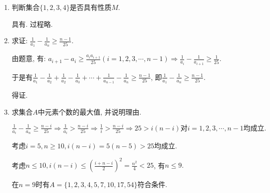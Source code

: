 \documentclass[8pt]{article}
\begin{document}
\begin{enumerate}[label=(\arabic*)]
			\begin{enumerate}[label=(\arabic*)]
				\item 判断集合$\{1,2,3,4\}$是否具有性质$M$.
					
					具有. 过程略.
				
				\item 求证: $\displaystyle \frac{1}{a_1}-\frac{1}{a_n}\geq\frac{n-1}{25}.$

					由题意, 有: $\displaystyle a_{i+1}-a_i \geq \frac{a_i a_{i+1}}{25} (i=1,2,3, \cdots, n-1) \Rightarrow \frac{1}{a_i}-\frac{1}{a_{i+1}}\geq \frac{1}{25}.$

					于是有$\displaystyle \frac{1}{a_1}-\frac{1}{a_2}+\frac{1}{a_2}-\frac{1}{a_3}+\cdots+\frac{1}{a_{n-1}}-\frac{1}{a_n}\geq\frac{n-1}{25}$, 即$\displaystyle\frac{1}{a_1}-\frac{1}{a_n}\geq\frac{n-1}{25}.$

					得证.
				
				\item 求集合$A$中元素个数的最大值, 并说明理由.

					$\displaystyle \frac{1}{a_i}-\frac{1}{a_n}\geq\frac{n-i}{25}\Rightarrow\frac{1}{a_i}>\frac{n-i}{25}\Rightarrow \frac{1}{i}>\frac{n-i}{25}\Rightarrow25>i(n-i)\text{对}i=1, 2, 3, \cdots, n-1\text{均成立}.$

					考虑$i=5, n\geq10, i(n-i)=5(n-5)>25$均成立.

					考虑$\displaystyle n\leq 10, i(n-i)\leq\left(\frac{i+n-i}{2}\right)^2=\frac{n^2}{4}<25$, 有$n\leq 9.$

					在$n=9$时有$A=\{1, 2, 3, 4, 5, 7, 10, 17, 54\}$符合条件.

			\end{enumerate}

	\end{enumerate}
\end{document}
